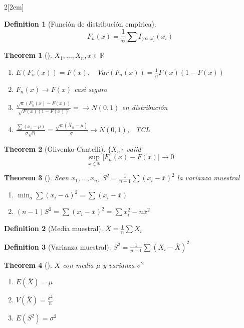 \documentclass[leqno]{article}
\newtheorem*{theorem}{Theorem}
\newtheorem*{definition}{Definition}
\begin{document}
\begin{multicols}{2}[\columnsep2em]
\begin{definition}[Función de distribución empírica]
  \[
	F_n(x) = \frac{1}{n}\sum I_{(\infty, x]}(x_i)
  \] 
\end{definition}

\begin{theorem}[]$X_1, \ldots, X_n, x \in \mathbb{R}$
  \begin{enumerate}[topsep=-6pt, itemsep=0pt]
	\item $E(F_n(x))=F(x), \quad Var(F_n(x))= \frac{1}{n}F(x)(1-F(x))$
	\item $F_n(x) \to  F(x)$ casi seguro
	\item $\frac{\sqrt{n} (F_n(x)-F(x))}{\sqrt{F(x)(1-F(x))} } = \to  N(0,1)$ en distribución
	\item $\frac{\sum (x_i -\mu)}{\sigma \sqrt{n}} = \frac{\sqrt{n} (\bar{X}_n-\mu) }{\sigma } \to N(0,1)$, \ TCL
  \end{enumerate}
\end{theorem}

\begin{theorem}[Glivenko-Cantelli] $\{X_n\}$ vaiid 
  \[
	\sup_{x\in \mathbb{R}} |F_n(x)-F(x)| \to 0
  \] 
\end{theorem}

\begin{theorem}[]
Sean $x_1, \ldots, x_n$,  $S^2 =\frac{1}{n-1}\sum (x_i-\overline{x}) ^2$ la varianza muestral
\begin{enumerate}[topsep=-6pt, itemsep=0pt]
  \item $\min_a \sum (x_i-a)^2 = \sum (x_i-\overline{x})$ 
  \item $(n-1)S^2 = \sum (x_i-\overline{x})^2 = \sum x_i^2-n\overline{x}^2$
\end{enumerate}
\end{theorem}

\begin{definition}[Media muestral]
$\overline{X} = \frac{1}{n}\sum X_i$
\end{definition}

\begin{definition}[Varianza muestral]
$S^2 = \frac{1}{n-1}\sum (X_i-\overline{X})^2$
\end{definition}

\begin{theorem}[] $X$ con media  $\mu$ y varianza $\sigma ^2$  
\begin{enumerate}[topsep=-6pt, itemsep=0pt]
  \item $E(\overline{X}) = \mu$
  \item $V(\overline{X}) = \frac{\sigma ^2}{n}$ 
  \item $E(S^2)=\sigma ^2$
\end{enumerate}
\end{theorem}


\end{multicols}
\end{document}
